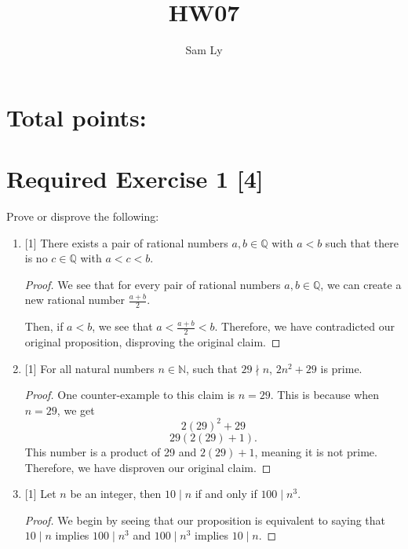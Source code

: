 \documentclass{article}
\title{HW07}
\author{Sam Ly}
\begin{document}
\maketitle

\section*{Total points: }

\section*{Required Exercise 1 [4]}

Prove or disprove the following:

\begin{enumerate}
    \item {
        [1] There exists a pair of rational numbers \(a, b \in \mathbb{Q}\) with 
        \(a < b\) such that there is no \(c \in \mathbb{Q}\) with \(a < c < b\).

        \begin{proof}
            We see that for every pair of rational numbers \(a, b \in \mathbb{Q}\), 
            we can create a new rational number \(\frac{a+b}{2}\).

            Then, if \(a < b\), we see that \(a < \frac{a + b }{2} < b\). 
            Therefore, we have contradicted our original proposition, disproving the 
            original claim.
        \end{proof}

    }

    \item {
        [1] For all natural numbers \(n \in \mathbb{N}\), such that \(29 \nmid n\),
        \(2n^2 + 29\) is prime.

        \begin{proof}
            One counter-example to this claim is \(n = 29\). This is because when
            \(n = 29\), we get 
            \[2(29)^2 + 29\]
            \[29(2(29) + 1).\]
            This number is a product of 29 and \(2(29) + 1\), meaning it is not prime. 
            Therefore, we have disproven our original claim.
        \end{proof}
    }

    \item {
        [1] Let \(n\) be an integer, then \(10 \mid n\) if and only if \(100 \mid n^3\).

        \begin{proof}
            We begin by seeing that our proposition is equivalent to saying that 
            \(10 \mid n\) implies \(100 \mid n^3\) and \(100 \mid n^3\) implies \(10 \mid n\). 


\end{proof}}
\end{enumerate}
\end{document}
